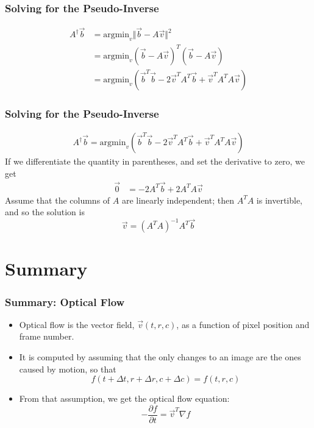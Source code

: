 \documentclass{beamer}
\begin{document}
\begin{frame}
  \frametitle{Solving for the Pseudo-Inverse}
  \begin{align*}
    A^\dag\vec{b} &= \mbox{argmin}_v\Vert\vec{b}-A\vec{v}\Vert^2\\
    &= \mbox{argmin}_v\left(\vec{b}-A\vec{v}\right)^T\left(\vec{b}-A\vec{v}\right)\\
    &= \mbox{argmin}_v\left(\vec{b}^T\vec{b}-2\vec{v}^TA^T\vec{b}+\vec{v}^TA^TA\vec{v}\right)
  \end{align*}
\end{frame}

\begin{frame}
  \frametitle{Solving for the Pseudo-Inverse}
  \begin{align*}
    A^\dag\vec{b}= \mbox{argmin}_v\left(\vec{b}^T\vec{b}-2\vec{v}^TA^T\vec{b}+\vec{v}^TA^TA\vec{v}\right)
  \end{align*}
  If we differentiate the quantity in parentheses, and set the derivative to zero, we get
  \begin{align*}
    \vec{0} &= -2A^T\vec{b}+2A^TA\vec{v}
  \end{align*}
  Assume that the columns of $A$ are linearly independent; then $A^TA$
  is invertible, and so the solution is
  \[
  \vec{v} = (A^TA)^{-1}A^T\vec{b}
  \]
\end{frame}

\section[Summary]{Summary}
\setcounter{subsection}{1}

\begin{frame}
  \frametitle{Summary: Optical Flow}

  \begin{itemize}
    \item Optical flow is the vector field, $\vec{v}(t,r,c)$, as a function of
      pixel position and frame number.
    \item It is computed by assuming that the only changes to an image
      are the ones caused by motion, so that
      \[
      f(t+\Delta t,r+\Delta r,c+\Delta c) = f(t,r,c)
      \]
    \item From that assumption, we get the optical flow equation:
      \[
      -\frac{\partial f}{\partial t} =\vec{v}^T\nabla f
      \]
  \end{itemize}
\end{frame}
\end{document}

